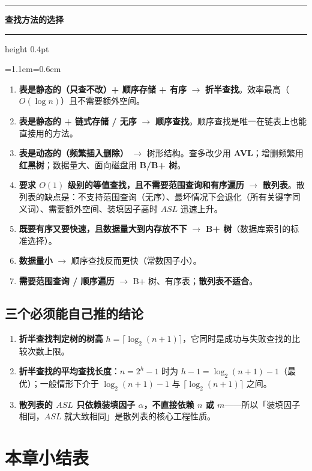 \documentclass[11pt,openany,UTF8]{ctexbook}
\newcommand{\callouthead}[2]{%
  \par\addvspace{7pt}\noindent
  {\color{#1}\rule[-0.15em]{3pt}{1.05em}}\hspace{0.5em}%
  {\bfseries\color{#1}#2}\par\nobreak\vspace{-0.35em}%
  {\color{rulesep}\hrule height 0.4pt}\nobreak\vspace{0.45em}%
  \begingroup\small\setlength{\parindent}{0pt}%
  \leftskip=1.1em\rightskip=0.6em\noindent\ignorespaces}
\newcommand{\calloutend}{\par\endgroup\addvspace{7pt}}
\newenvironment{callkey}[1]{\callouthead{keybar}{#1}}{\calloutend}
\begin{document}
\begin{callkey}{查找方法的选择}
\begin{enumerate}
\item \textbf{表是静态的（只查不改）+ 顺序存储 + 有序} $\to$ \textbf{折半查找}。效率最高（$O(\log n)$）且不需要额外空间。
\item \textbf{表是静态的 + 链式存储 / 无序} $\to$ \textbf{顺序查找}。顺序查找是唯一在链表上也能直接用的方法。
\item \textbf{表是动态的（频繁插入删除）} $\to$ 树形结构。查多改少用 \textbf{AVL}；增删频繁用 \textbf{红黑树}；数据量大、面向磁盘用 \textbf{B/B+ 树}。
\item \textbf{要求 $O(1)$ 级别的等值查找，且不需要范围查询和有序遍历} $\to$ \textbf{散列表}。散列表的缺点是：不支持范围查询（无序）、最坏情况下会退化（所有关键字同义词）、需要额外空间、装填因子高时 $ASL$ 迅速上升。
\item \textbf{既要有序又要快速，且数据量大到内存放不下} $\to$ \textbf{B+ 树}（数据库索引的标准选择）。
\item \textbf{数据量小} $\to$ 顺序查找反而更快（常数因子小）。
\item \textbf{需要范围查询 / 顺序遍历} $\to$ B+ 树、有序表；\textbf{散列表不适合}。
\end{enumerate}
\end{callkey}

\subsection{三个必须能自己推的结论}

\begin{enumerate}
\item \textbf{折半查找判定树的树高} $h=\lceil\log_2(n+1)\rceil$，它同时是成功与失败查找的比较次数上限。
\item \textbf{折半查找的平均查找长度}：$n=2^h-1$ 时为 $h-1=\log_2(n+1)-1$（最优）；一般情形下介于 $\log_2(n+1)-1$ 与 $\lceil\log_2(n+1)\rceil$ 之间。
\item \textbf{散列表的 $ASL$ 只依赖装填因子 $\alpha$，不直接依赖 $n$ 或 $m$}——所以「装填因子相同，$ASL$ 就大致相同」是散列表的核心工程性质。
\end{enumerate}
\section*{本章小结表}
\end{document}
